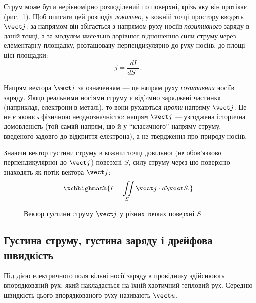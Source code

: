Струм може бути нерівномірно розподілений по поверхні, крізь яку він протікає (рис.~\ref{pic:IjS}). Щоб описати цей розподіл \emph{локально}, у
кожній точці простору вводять  $\vect j$: за напрямом він збігається з напрямом руху носіїв \emph{позитивного} заряду
в даній точці, а за модулем чисельно дорівнює відношенню сили струму через елементарну площадку, розташовану перпендикулярно до руху носіїв, до
площі цієї площадки:
\begin{equation}\label{eq:CurrentDensityDef}
	j = \frac{dI}{dS_\perp}.
\end{equation}

\begin{Attention}
	Напрям вектора $\vect j$ за означенням --- це напрям руху \emph{позитивних} носіїв заряду. Якщо реальними носіями струму є від'ємно заряджені
	частинки (наприклад, електрони в металі), то вони рухаються \emph{проти} напряму $\vect j$. Це не є якоюсь фізичною неоднозначністю: напрям
	$\vect j$ --- узгоджена історична домовленість (той самий напрям, що й у \enquote{класичного} напряму струму, введеного задовго до відкриття електрона),
	а не твердження про природу носіїв.
\end{Attention}

Знаючи вектор густини струму в кожній точці довільної (не обов'язково перпендикулярної до $\vect j$) поверхні $S$, силу струму через цю поверхню
знаходять як потік вектора $\vect j$:
\begin{equation}\label{eq:CurrentFlux}
	\tcbhighmath{
		I = \iint\limits_S \vect j \cdot d\vect S.
	}
\end{equation}

\begin{figure}\centering
	\caption{Вектор густини струму $\vect j$ у різних точках поверхні $S$\label{pic:IjS}}
\end{figure}

\subsection*{Густина струму, густина заряду і дрейфова швидкість}

Під дією електричного поля вільні носії заряду в провіднику здійснюють впорядкований рух, який накладається на їхній хаотичний тепловий рух. Середню
швидкість цього впорядкованого руху називають  $\vect u$.

